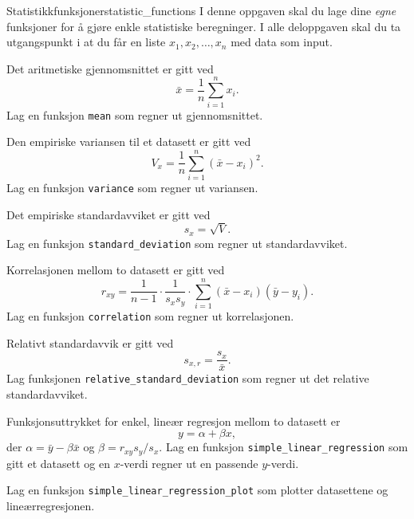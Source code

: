 \begin{exercise}{Statistikkfunksjoner}{statistic_functions}
	I denne oppgaven skal du lage dine \emph{egne} funksjoner for å gjøre enkle statistiske beregninger. I alle deloppgaven skal du ta utgangspunkt i at du får en liste $x_1, x_2, \ldots, x_n$ med data som input.
	
	\subexercise Det aritmetiske gjennomsnittet er gitt ved
	\begin{equation*}
	\bar{x} = \frac{1}{n}\sum_{i=1}^{n}x_i.
	\end{equation*}
	Lag en funksjon \texttt{mean} som regner ut gjennomsnittet.
	
	\subexercise Den empiriske variansen til et datasett er gitt ved
	\begin{equation*}
	V_x = \frac{1}{n}\sum\limits_{i=1}^{n}\left( \bar{x}-x_i\right)^2. 
	\end{equation*}
	Lag en funksjon \texttt{variance} som regner ut variansen.
	
	\subexercise Det empiriske standardavviket er gitt ved
	\begin{equation*}
	s_x=\sqrt{V}.
	\end{equation*}
	Lag en funksjon \texttt{standard_deviation} som regner ut standardavviket.
	
	\subexercise Korrelasjonen mellom to datasett er gitt ved
	\begin{equation*}
	r_{xy}=\frac{1}{n-1}\cdot\frac{1}{s_x s_y}\cdot \sum_{i=1}^{n}\left( \bar{x}-x_i\right) \left( \bar{y}-y_i\right) .
	\end{equation*}
	Lag en funksjon \texttt{correlation} som regner ut korrelasjonen.
	
	\subexercise Relativt standardavvik er gitt ved
	\begin{equation*}
	s_{x,r} = \frac{s_x}{\bar{x}}.
	\end{equation*}
	Lag funksjonen \texttt{relative_standard_deviation} som regner ut det relative standardavviket.
	
	\subexercise Funksjonsuttrykket for enkel, lineær regresjon mellom to datasett er
	\begin{equation*}
	y=\alpha+\beta x,
	\end{equation*}
	der $\alpha=\bar{y}-\beta\bar{x}$ og $\beta=r_{xy} s_y/s_x$. Lag en funksjon \texttt{simple_linear_regression} som gitt et datasett og en $x$-verdi regner ut en passende $y$-verdi.
	
	\subexercise Lag en funksjon \texttt{simple_linear_regression_plot} som plotter datasettene og lineærregresjonen.
\end{exercise}

